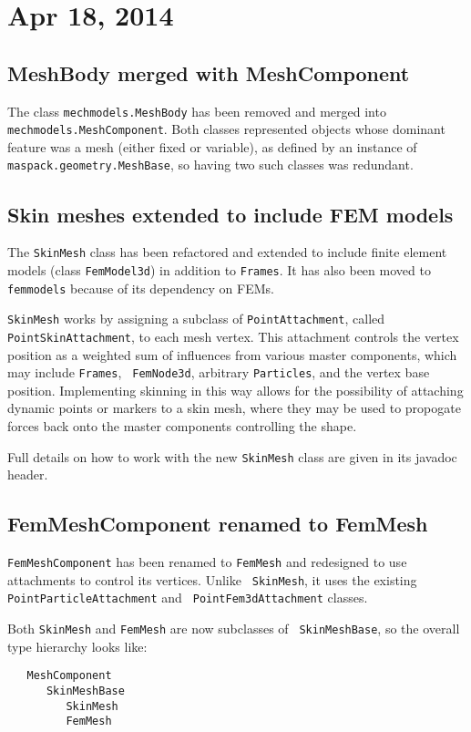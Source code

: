 \documentclass{article}
\begin{document}
\section*{Apr 18, 2014}

\subsection*{MeshBody merged with MeshComponent}

The class {\tt mechmodels.MeshBody} has been removed and merged into
{\tt mechmodels.MeshComponent}. Both classes represented objects whose
dominant feature was a mesh (either fixed or variable), as defined by
an instance of {\tt maspack.geometry.MeshBase}, so having two such
classes was redundant.

\subsection*{Skin meshes extended to include FEM models}

The {\tt SkinMesh} class has been refactored and extended to include
finite element models (class {\tt FemModel3d}) in addition to {\tt Frames}.
It has also been moved to {\tt femmodels} because of its
dependency on FEMs.

{\tt SkinMesh} works by assigning a subclass of {\tt PointAttachment},
called {\tt PointSkinAttachment}, to each mesh vertex. This attachment
controls the vertex position as a weighted sum of influences from
various master components, which may include {\tt Frames}, {\tt
FemNode3d}, arbitrary {\tt Particles}, and the vertex base
position. Implementing skinning in this way allows for the possibility
of attaching dynamic points or markers to a skin mesh, where they may
be used to propogate forces back onto the master components
controlling the shape.

Full details on how to work with the new {\tt SkinMesh} class are
given in its javadoc header.

\subsection*{FemMeshComponent renamed to FemMesh}

{\tt FemMeshComponent} has been renamed to {\tt FemMesh} and
redesigned to use attachments to control its vertices. Unlike {\tt
SkinMesh}, it uses the existing {\tt PointParticleAttachment} and {\tt
PointFem3dAttachment} classes.

Both {\tt SkinMesh} and {\tt FemMesh} are now subclasses of {\tt
SkinMeshBase}, so the overall type hierarchy looks like:
\begin{lstlisting}
   MeshComponent
      SkinMeshBase
         SkinMesh
         FemMesh 
\end{lstlisting}
\end{document}
